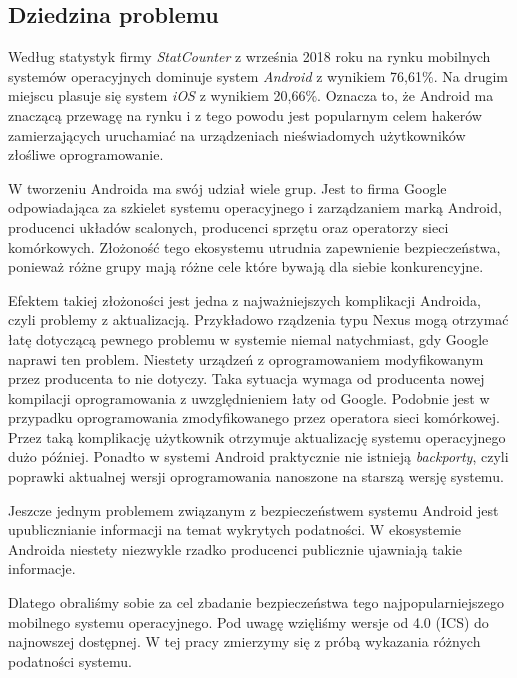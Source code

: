 \subsection{Dziedzina problemu}
Według statystyk firmy \emph{StatCounter} \cite{article_mobile_os_market_stats} z września 2018 roku na rynku mobilnych
systemów operacyjnych dominuje system \emph{Android} z wynikiem 76,61\%.
Na drugim miejscu plasuje się system \emph{iOS} z wynikiem 20,66\%.
Oznacza to, że Android ma znaczącą przewagę na rynku i z tego powodu jest popularnym celem hakerów zamierzających
uruchamiać na urządzeniach nieświadomych użytkowników złośliwe oprogramowanie.

W tworzeniu Androida ma swój udział wiele grup.
Jest to firma Google odpowiadająca za szkielet systemu operacyjnego i zarządzaniem marką Android, producenci układów
scalonych, producenci sprzętu oraz operatorzy sieci komórkowych.
Złożoność tego ekosystemu utrudnia zapewnienie bezpieczeństwa, ponieważ różne grupy mają różne cele które bywają dla
siebie konkurencyjne.

Efektem takiej złożoności jest jedna z najważniejszych komplikacji Androida, czyli problemy z aktualizacją.
Przykładowo rządzenia typu Nexus mogą otrzymać łatę dotyczącą pewnego problemu w systemie niemal natychmiast, gdy Google
naprawi ten problem.
Niestety urządzeń z oprogramowaniem modyfikowanym przez producenta to nie dotyczy.
Taka sytuacja wymaga od producenta nowej kompilacji oprogramowania z uwzględnieniem łaty od Google.
Podobnie jest w przypadku oprogramowania zmodyfikowanego przez operatora sieci komórkowej.
Przez taką komplikację użytkownik otrzymuje aktualizację systemu operacyjnego dużo później.
Ponadto w systemi Android praktycznie nie istnieją \textit{backporty}, czyli poprawki aktualnej wersji oprogramowania
nanoszone na starszą wersję systemu.

Jeszcze jednym problemem związanym z bezpieczeństwem systemu Android jest upublicznianie informacji na temat wykrytych
podatności.
W ekosystemie Androida niestety niezwykle rzadko producenci publicznie ujawniają takie informacje.

Dlatego obraliśmy sobie za cel zbadanie bezpieczeństwa tego najpopularniejszego mobilnego systemu operacyjnego.
Pod uwagę wzięliśmy wersje od 4.0 (ICS) do najnowszej dostępnej. W tej pracy zmierzymy się z próbą wykazania różnych
podatności systemu.
